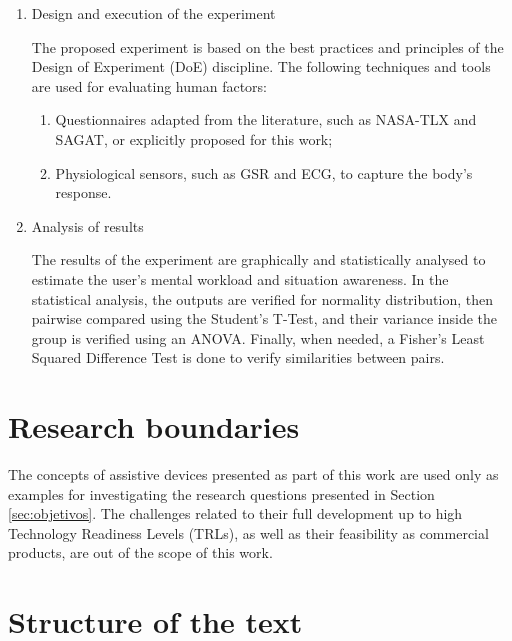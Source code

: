 \begin{enumerate}[leftmargin = 6em, label = Step \arabic* -- ]
    \item Design and execution of the experiment
    
    The proposed experiment is based on the best practices and principles of the Design of Experiment (DoE) discipline.
    The following techniques and tools are used for evaluating human factors:

    \begin{enumerate}[label = \alph*)]
        \item Questionnaires adapted from the literature, such as NASA-TLX and SAGAT, or explicitly proposed for this work;
        \item Physiological sensors, such as GSR and ECG, to capture the body's response.
    \end{enumerate}
    
    \item Analysis of results
    
    The results of the experiment are graphically and statistically analysed to estimate the user's mental workload and situation awareness. In the statistical analysis, the outputs are verified for normality distribution, then pairwise compared using the Student's T-Test, and their variance inside the group is verified using an ANOVA. Finally, when needed, a Fisher's Least Squared Difference Test is done to verify similarities between pairs.

\end{enumerate}


\FloatBarrier

\section{Research boundaries}


The concepts of assistive devices presented as part of this work are used only as examples for investigating the research questions presented in Section \ref{sec:objetivos}. The challenges related to their full development up to high Technology Readiness Levels (TRLs), as well as their feasibility as commercial products, are out of the scope of this work.


\section{Structure of the text}

